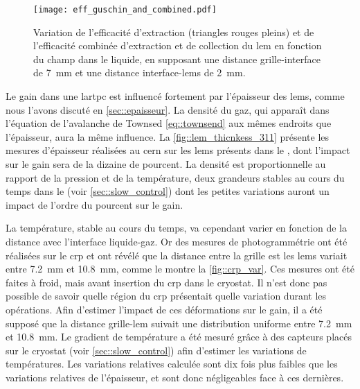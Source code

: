       \begin{figure}[htbp]
        \centering
        \texttt{[image: eff\_guschin\_and\_combined.pdf]}
        \caption[Efficacité combinée d'extraction et de collection en fonction du champ dans le liquide]{\label{fig::eff_guschin_and_combined}Variation de l'efficacité d'extraction (triangles rouges pleins) et de l'efficacité combinée d'extraction et de collection du \gls{lem} en fonction du champ dans le liquide, en supposant une distance grille-interface de \SI{7}{\milli\meter} et une distance interface-\glspl{lem} de \SI{2}{\milli\meter}.}
      \end{figure}

      Le gain dans une \gls{lartpc} est influencé fortement par l'épaisseur des \glspl{lem}, comme nous l'avons discuté en \autoref{sec::epaisseur}. La densité du gaz, qui apparaît dans l'équation de l'avalanche de Townsed \eqref{eq::townsend} aux mêmes endroits que l'épaisseur, aura la même influence. La \autoref{fig::lem_thicnkess_311} présente les mesures d'épaisseur réalisées au \gls{cern} sur les \glspl{lem} présents dans le \TOO{}, dont l'impact sur le gain sera de la dizaine de pourcent. La densité est proportionnelle au rapport de la pression et de la température, deux grandeurs stables au cours du temps dans le \TOO{} (voir \autoref{sec::slow_control}) dont les petites variations auront un impact de l'ordre du pourcent sur le gain. 

      La température, stable au cours du temps, va cependant varier en fonction de la distance avec l'interface liquide-gaz. Or des mesures de photogrammétrie ont été réalisées sur le \gls{crp} et ont révélé que la distance entre la grille est les \glspl{lem} variait entre \SI{7.2}{\milli\meter} et \SI{10.8}{\milli\meter}, comme le montre la \autoref{fig::crp_var}. Ces mesures ont été faites à froid, mais avant insertion du \gls{crp} dans le cryostat. Il n'est donc pas possible de savoir quelle région du \gls{crp} présentait quelle variation durant les opérations. Afin d'estimer l'impact de ces déformations sur le gain, il a été supposé que la distance grille-\gls{lem} suivait une distribution uniforme entre \SI{7.2}{\milli\meter} et \SI{10.8}{\milli\meter}. Le gradient de température a été mesuré grâce à des capteurs placés sur le cryostat (voir \autoref{sec::slow_control}) afin d'estimer les variations de températures. Les variations relatives calculée sont dix fois plus faibles que les variations relatives de l'épaisseur, et sont donc négligeables face à ces dernières.

